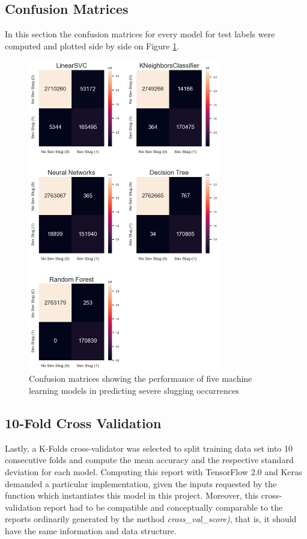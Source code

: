 \documentclass{article}
\begin{document}
\subsection{Confusion Matrices}
In this section the confusion matrices for every model for test labels were computed and plotted side by side on Figure \ref{fig:confusion_matrices}.

\begin{figure}
\centering
\includegraphics[width=0.75\textwidth]{confusion_matrices.png}
\caption{\label{fig:confusion_matrices}Confusion matrices showing the performance of five machine learning models in predicting severe slugging occurrences}
\end{figure}

\subsection{10-Fold Cross Validation}
Lastly, a K-Folds cross-validator was selected to split training data set into 10 consecutive folds and compute the mean accuracy and the respective standard deviation for each model. Computing this report with TensorFlow 2.0 and Keras demanded a particular implementation, given the inputs requested by the function which instantiates this model in this project. Moreover, this cross-validation report had to be compatible and conceptually comparable to the reports ordinarily generated by the method \emph{cross\_val\_score)}, that is, it should have the same information and data structure. 
\end{document}
